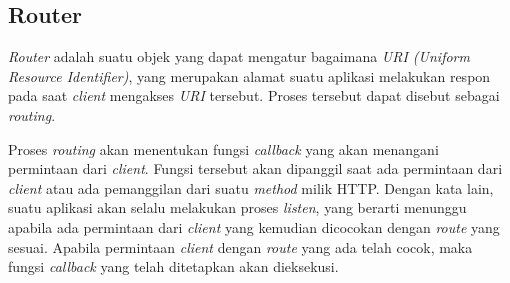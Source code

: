 \subsection{Router}
\label{subsec:router}

\textit{Router} adalah suatu objek yang dapat mengatur bagaimana \textit{URI (Uniform Resource Identifier)}, yang merupakan alamat suatu aplikasi melakukan respon pada saat \textit{client} mengakses \textit{URI} tersebut. Proses tersebut dapat disebut sebagai \textit{routing}.

Proses \textit{routing} akan menentukan fungsi \textit{callback} yang akan menangani permintaan dari \textit{client}. Fungsi tersebut akan dipanggil saat ada permintaan dari \textit{client} atau ada pemanggilan dari suatu \textit{method} milik HTTP. Dengan kata lain, suatu aplikasi akan selalu melakukan proses \textit{listen}, yang berarti menunggu apabila ada permintaan dari \textit{client} yang kemudian dicocokan dengan \textit{route} yang sesuai. Apabila permintaan \textit{client} dengan \textit{route} yang ada telah cocok, maka fungsi \textit{callback} yang telah ditetapkan akan dieksekusi.

